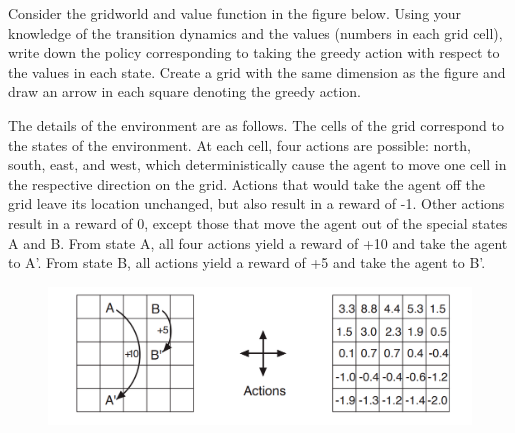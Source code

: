 Consider the gridworld and value function in the figure below.
Using your knowledge of the transition dynamics and the values (numbers in each grid cell), write down the policy corresponding to taking the greedy action with respect to the values in each state.
Create a grid with the same dimension as the figure and draw an arrow in each square denoting the greedy action.

The details of the environment are as follows. The cells of the grid correspond to the states of the environment. At each cell, four actions are possible: north, south, east, and west, which deterministically 
cause the agent to move one cell in the respective direction on the grid. Actions that would take the agent off the grid leave its location unchanged, but also result in a reward of -1.
Other actions result in a reward of 0, except those that move the agent out of the special states A and B. From state A, all four actions yield a reward of +10 and take the agent to A'. From state B, all actions yield a reward of +5 and take the agent to B'.
\begin{figure}[h!]
  \center
\includegraphics[width=0.9\linewidth]{figures/figure_3dot2.png}
\end{figure}

\bigspace